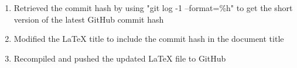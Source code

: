 \begin{enumerate}
    \item Retrieved the commit hash by using "git log -1 --format=\%h" to get the short version of the latest GitHub commit hash
    \item Modified the LaTeX title to include the commit hash in the document title
    \item Recompiled and pushed the updated LaTeX file to GitHub
\end{enumerate}





